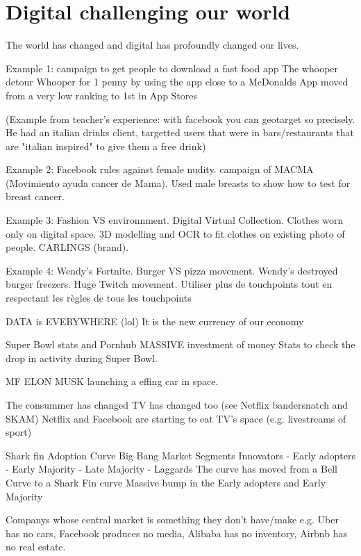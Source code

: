 \vspace{-1.2cm}

\section{Digital challenging our world}

The world has changed and digital has profoundly changed our lives.

Example 1: campaign to get people to download a fast food app
The whooper detour
Whooper for 1 penny by using the app close to a McDonalds
App moved from a very low ranking to 1st in App Stores

(Example from teacher's experience: with facebook you can geotarget so precisely. He had an italian drinks client, targetted users that were in bars/restaurants that are "italian inspired" to give them a free drink)

Example 2: Facebook rules against female nudity. campaign of MACMA (Movimiento ayuda cancer de Mama). Used male breasts to show how to test for breast cancer.

Example 3: Fashion VS environnment.
Digital Virtual Collection. Clothes worn only on digital space.
3D modelling and OCR to fit clothes on existing photo of people.
CARLINGS (brand).

Example 4: Wendy's
Fortnite. Burger VS pizza movement. Wendy's destroyed burger freezers.
Huge Twitch movement. Utiliser plus de touchpoints tout en respectant les règles de tous les touchpoints


DATA is EVERYWHERE (lol)
It is the new currency of our economy

Super Bowl stats and Pornhub
MASSIVE investment of money
Stats to check the drop in activity during Super Bowl.

MF ELON MUSK launching a effing car in space.

The consummer has changed
TV has changed too (see Netflix bandersnatch and SKAM)
Netflix and Facebook are starting to eat TV's space (e.g. livestreams of sport)

Shark fin Adoption Curve
Big Bang Market Segments
Innovators - Early adopters - Early Majority - Late Majority - Laggards
The curve has moved from a Bell Curve to a Shark Fin curve
Massive bump in the Early adopters and Early Majority

Companys whose central market is something they don't have/make
e.g. Uber has no cars, Facebook produces no media, Alibaba has no inventory, Airbnb has no real estate.

